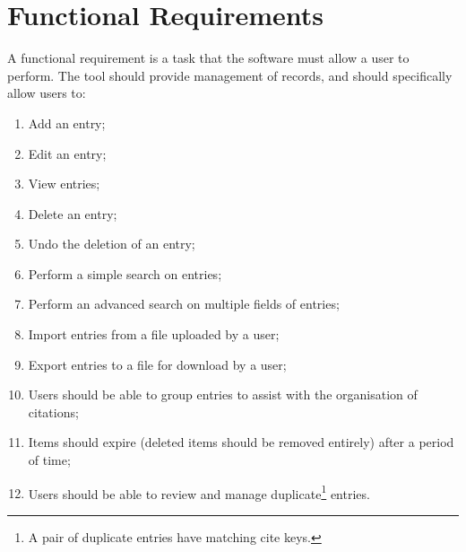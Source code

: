 \section{Functional Requirements}
\label{funcReq}
A functional requirement is a task that the software must allow a user to perform.  The tool should provide management of \bibtex{} records, and should specifically allow users to:
\begin{enumerate}
\item Add an entry;
\item Edit an entry;
\item View entries;
\item Delete an entry;
\item Undo the deletion of an entry;
\item Perform a simple search on entries;
\item Perform an advanced search on multiple fields of entries;
\item Import entries from a file uploaded by a user;
\item Export entries to a file for download by a user;
\item Users should be able to group entries to assist with the organisation of citations;
\item Items should expire (deleted items should be removed entirely) after a period of time;
\item Users should be able to review and manage duplicate\footnote{A pair of duplicate entries have matching cite keys.} entries.
\end{enumerate}

